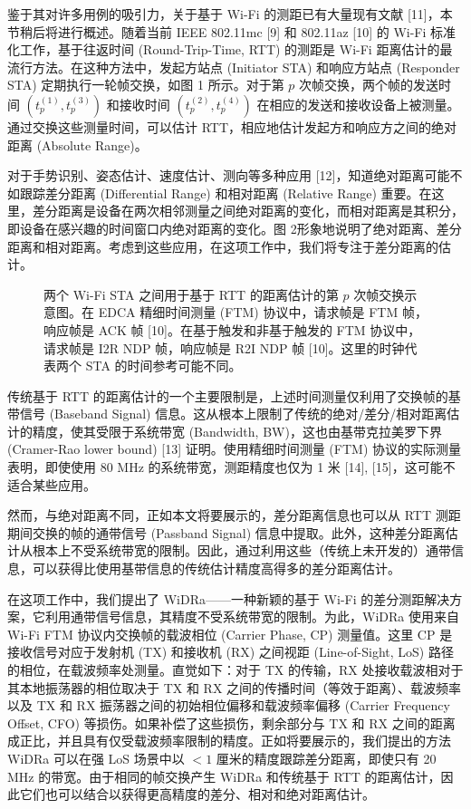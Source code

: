 \documentclass[journal]{IEEEtran}
\begin{document}
鉴于其对许多用例的吸引力，关于基于 Wi-Fi 的测距已有大量现有文献 [11]，本节稍后将进行概述。随着当前 IEEE 802.11mc [9] 和 802.11az [10] 的 Wi-Fi 标准化工作，基于往返时间 (Round-Trip-Time, RTT) 的测距是 Wi-Fi 距离估计的最流行方法。在这种方法中，发起方站点 (Initiator STA) 和响应方站点 (Responder STA) 定期执行一轮帧交换，如图 1 所示。对于第 $p$ 次帧交换，两个帧的发送时间 $(t_{p}^{(1)}, t_{p}^{(3)})$ 和接收时间 $(t_{p}^{(2)}, t_{p}^{(4)})$ 在相应的发送和接收设备上被测量。通过交换这些测量时间，可以估计 RTT，相应地估计发起方和响应方之间的绝对距离 (Absolute Range)。

对于手势识别、姿态估计、速度估计、测向等多种应用 [12]，知道绝对距离可能不如跟踪差分距离 (Differential Range) 和相对距离 (Relative Range) 重要。在这里，差分距离是设备在两次相邻测量之间绝对距离的变化，而相对距离是其积分，即设备在感兴趣的时间窗口内绝对距离的变化。图 2形象地说明了绝对距离、差分距离和相对距离。考虑到这些应用，在这项工作中，我们将专注于差分距离的估计。

\begin{figure}[htbp]
\centering
{}
\caption{两个 Wi-Fi STA 之间用于基于 RTT 的距离估计的第 $p$ 次帧交换示意图。在 EDCA 精细时间测量 (FTM) 协议中，请求帧是 FTM 帧，响应帧是 ACK 帧 [10]。在基于触发和非基于触发的 FTM 协议中，请求帧是 I2R NDP 帧，响应帧是 R2I NDP 帧 [10]。这里的时钟代表两个 STA 的时间参考可能不同。}
\label{fig:fig1}
\end{figure}

传统基于 RTT 的距离估计的一个主要限制是，上述时间测量仅利用了交换帧的基带信号 (Baseband Signal) 信息。这从根本上限制了传统的绝对/差分/相对距离估计的精度，使其受限于系统带宽 (Bandwidth, BW)，这也由基带克拉美罗下界 (Cramer-Rao lower bound) [13] 证明。使用精细时间测量 (FTM) 协议的实际测量表明，即使使用 80 MHz 的系统带宽，测距精度也仅为 1 米 [14], [15]，这可能不适合某些应用。

然而，与绝对距离不同，正如本文将要展示的，差分距离信息也可以从 RTT 测距期间交换的帧的通带信号 (Passband Signal) 信息中提取。此外，这种差分距离估计从根本上不受系统带宽的限制。因此，通过利用这些（传统上未开发的）通带信息，可以获得比使用基带信息的传统估计精度高得多的差分距离估计。

在这项工作中，我们提出了 WiDRa——一种新颖的基于 Wi-Fi 的差分测距解决方案，它利用通带信号信息，其精度不受系统带宽的限制。为此，WiDRa 使用来自 Wi-Fi FTM 协议内交换帧的载波相位 (Carrier Phase, CP) 测量值。这里 CP 是接收信号对应于发射机 (TX) 和接收机 (RX) 之间视距 (Line-of-Sight, LoS) 路径的相位，在载波频率处测量。直觉如下：对于 TX 的传输，RX 处接收载波相对于其本地振荡器的相位取决于 TX 和 RX 之间的传播时间（等效于距离）、载波频率以及 TX 和 RX 振荡器之间的初始相位偏移和载波频率偏移 (Carrier Frequency Offset, CFO) 等损伤。如果补偿了这些损伤，剩余部分与 TX 和 RX 之间的距离成正比，并且具有仅受载波频率限制的精度。正如将要展示的，我们提出的方法 WiDRa 可以在强 LoS 场景中以 $<1$ 厘米的精度跟踪差分距离，即使只有 20 MHz 的带宽。由于相同的帧交换产生 WiDRa 和传统基于 RTT 的距离估计，因此它们也可以结合以获得更高精度的差分、相对和绝对距离估计。
\end{document}

